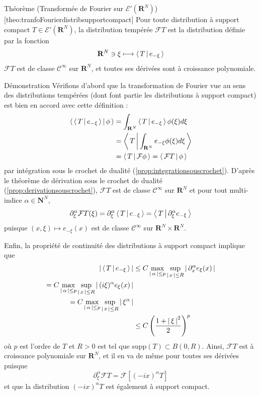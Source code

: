         \begin{omed}{Théorème (Transformée de Fourier sur $\mathcal{E}'(\mathbf{R}^N)$)}[theo:tranfoFourierdistribsupportcompact]
            Pour toute distribution à support compact $T \in \mathcal{E}'(\mathbf{R}^N)$, la distribution tempérée $\mathcal{F}T$ est la distribution définie par la fonction 
            \[ \mathbf{R}^N \ni \xi \longmapsto \left< \, T \, \middle| \, e_{-\xi} \, \right> \]   
            $\mathcal{F}T$ est de classe $\mathcal{C}^{\infty}$ sur $\mathbf{R}^N$, et toutes ses dérivées sont à croissance polynomiale.
        \end{omed}

        \begin{demo}{Démonstration}
            Vérifions d’abord que la transformation de Fourier vue au sens des distributions tempérées (dont font partie les distributions à support compact) est bien en accord avec cette définition :
            \begin{align*}
                \left< \, \left< \, T \, \middle| \, e_{-\xi} \, \right> \, \middle| \, \phi \, \right> 
                &= \int_{\mathbf{R}^N} \left< \, T \, \middle| \, e_{-\xi} \, \right> \phi(\xi) d\xi \\
                &= \left< \, T \, \middle| \, \int_{\mathbf{R}^N} e_{-\xi}\phi(\xi)d\xi \, \right> \\
                &= \left< \, T \, \middle| \, \mathcal{F}\phi \, \right> = \left< \, \mathcal{F}T \, \middle| \, \phi \, \right>
            \end{align*}
            par intégration sous le crochet de dualité (\ref{prop:integrationsouscrochet}). D’après le théorème de dérivation sous le crochet de dualité (\ref{prop:derivationsouscrochet}), $\mathcal{F}T$ est de classe $\mathcal{C}^{\infty}$ sur $\mathbf{R}^N$ et pour tout multi-indice $\alpha \in \mathbf{N}^N$, 
            \[ \partial_{\xi}^{\alpha} \mathcal{F}T(\xi) = \partial_{\xi}^{\alpha} \left< \, T \, \middle| \, e_{-\xi} \, \right> = \left< \, T \, \middle| \, \partial_{\xi}^{\alpha} e_{-\xi} \, \right> \]   
            puisque $(x, \xi) \mapsto e_{-\xi}(x)$ est de classe $\mathcal{C}^{\infty}$ sur $\mathbf{R}^N \times \mathbf{R}^N$.

            Enfin, la propriété de continuité des distributions à support compact implique que 
            \begin{align*}
                \left\lvert \, \left< \, T \, \middle| \, e_{-\xi} \, \right> \, \right\rvert 
                &\leq C \max_{\left\lvert \, \alpha \, \right\rvert \leq p} \sup_{\left\lvert \, x \, \right\rvert \leq R} \left\lvert \, \partial_x^{\alpha} e_{\xi}(x) \, \right\rvert \\
                = C \max_{\left\lvert \, \alpha \, \right\rvert \leq p} \sup_{\left\lvert \, x \, \right\rvert \leq R} \left\lvert \, (i\xi)^{\alpha} e_{\xi}(x) \, \right\rvert \\
                = C \max_{\left\lvert \, \alpha \, \right\rvert \leq p} \sup_{\left\lvert \, x \, \right\rvert \leq R} \left\lvert \, \xi^{\alpha} \, \right\rvert \\
                &\leq C \left(\frac{1 + \left\lvert \, \xi \, \right\rvert^2}{2}\right)^p
            \end{align*}
            où $p$ est l’ordre de $T$ et $R> 0$ est tel que $\text{supp}(T) \subset B(0,R)$. Ainsi, $\mathcal{F}T$ est à croissance polynomiale sur $\mathbf{R}^N$, et il en va de même pour toutes ses dérivées puisque 
            \[ \partial^{\alpha}_{\xi} \mathcal{F}T = \mathcal{F}[(-ix)^{\alpha} T] \]   
            et que la distribution $(-ix)^{\alpha} T$ est également à support compact.
        \end{demo}

